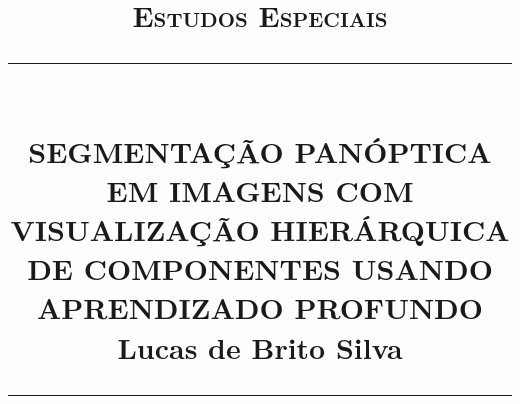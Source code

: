 \newcommand{\HRule}[1]{\rule{\linewidth}{#1}}
\begin{titlepage}
    \title{
        \normalsize  \textsc{Estudos Especiais} \\ [2.0cm]
		\HRule{0.5pt} \\  [0.75cm]
		\LARGE \textbf{\uppercase{SEGMENTAÇÃO PANÓPTICA EM IMAGENS COM VISUALIZAÇÃO HIERÁRQUICA DE COMPONENTES USANDO APRENDIZADO PROFUNDO}} \\ [1.3cm]
		\large \textbf{Lucas de Brito Silva} \\ [0.5cm]
		\HRule{1.5pt} \\ [0.5cm]
		\normalsize \vspace*{5\baselineskip}
	}

	\date{}

    \maketitle
    \thispagestyle{empty}
\end{titlepage}